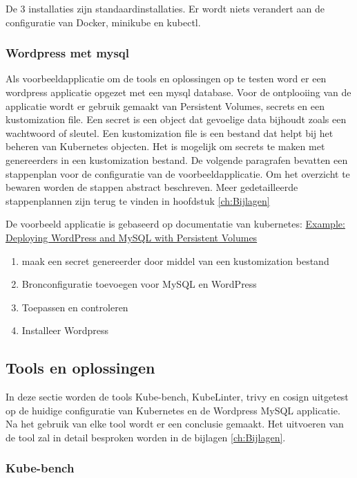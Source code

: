 De 3 installaties zijn standaardinstallaties. Er wordt niets verandert aan de configuratie van Docker, minikube en kubectl.

\subsubsection{Wordpress met mysql}

Als voorbeeldapplicatie om de tools en oplossingen op te testen word er een wordpress applicatie opgezet met een mysql database. Voor de ontplooiing van de applicatie wordt er gebruik gemaakt van Persistent Volumes, secrets en een kustomization file.
Een secret is een object dat gevoelige data bijhoudt zoals een wachtwoord of sleutel. Een kustomization file is een bestand dat helpt bij het beheren van Kubernetes objecten. Het is mogelijk om secrets te maken met genereerders  in een kustomization bestand.
De volgende paragrafen bevatten een stappenplan voor de configuratie van de voorbeeldapplicatie. Om het overzicht te bewaren worden de stappen abstract beschreven. Meer gedetailleerde stappenplannen zijn terug te vinden in hoofdstuk \ref{ch:Bijlagen} 

De voorbeeld applicatie is gebaseerd op documentatie van kubernetes: \href{https://kubernetes.io/docs/tutorials/stateful-application/mysql-wordpress-persistent-volume/}{Example: Deploying WordPress and MySQL with Persistent Volumes}

\begin{enumerate}
    \item maak een secret genereerder door middel van een kustomization bestand
    \item Bronconfiguratie toevoegen voor MySQL en WordPress
    \item Toepassen en controleren 
    \item Installeer Wordpress
\end{enumerate}

\subsection{Tools en oplossingen}

In deze sectie worden de tools Kube-bench, KubeLinter, trivy en cosign uitgetest op de huidige configuratie van Kubernetes en de Wordpress MySQL applicatie. Na het gebruik van elke tool wordt er een conclusie gemaakt. Het uitvoeren van de tool zal in detail besproken worden in de bijlagen \ref{ch:Bijlagen}. 

\subsubsection{Kube-bench}

